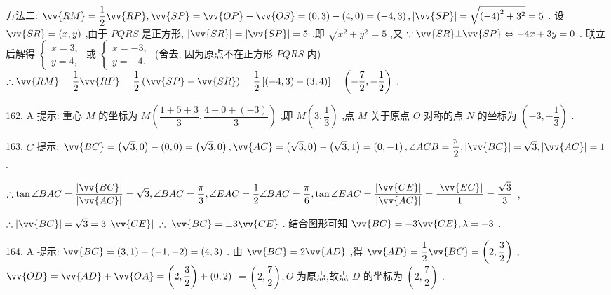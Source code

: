 方法二: $\vv{RM} = \dfrac{1}{2}\vv{RP},\vv{SP} = \vv{OP} - \vv{OS} = \left( {0,3}\right)  - \left( {4,0}\right)  = \left( {-4,3}\right) ,\left| \vv{SP}\right|  = \sqrt{{\left( -4\right) }^{2} + {3}^{2}} = 5$ . 设 $\vv{SR} = \left( {x,y}\right)$ ,由于 ${PQRS}$ 是正方形, $\left| \vv{SR}\right|  = \left| \vv{SP}\right|  = 5$ ,即 $\sqrt{{x}^{2} + {y}^{2}} = 5$ ,又 $\because \vv{SR}\bot \vv{SP} \Leftrightarrow   - {4x} + {3y} = 0$ . 联立后解得 $\left\{  \begin{array}{l} x = 3, \\  y = 4, \end{array}\right.$ 或 $\left\{  \begin{array}{l} x =  - 3, \\  y =  - 4. \end{array}\right.$ (舍去, 因为原点不在正方形 ${PQRS}$ 内) $\therefore \vv{RM} = \dfrac{1}{2}\vv{RP} = \dfrac{1}{2}\left( {\vv{SP} - \vv{SR}}\right)  = \dfrac{1}{2}\left\lbrack  {\left( {-4,3}\right)  - \left( {3,4}\right) }\right\rbrack   = \left( {-\dfrac{7}{2}, - \dfrac{1}{2}}\right)$ .

162. A 提示: 重心 $M$ 的坐标为 $M\left( {\dfrac{1 + 5 + 3}{3},\dfrac{4 + 0 + \left( {-3}\right) }{3}}\right)$ ,即 $M\left( {3,\dfrac{1}{3}}\right)$ ,点 $M$ 关于原点 $O$ 对称的点 $N$ 的坐标为 $\left( {-3, - \dfrac{1}{3}}\right)$ .

163. $C$ 提示: $\vv{BC} = \left( {\sqrt{3},0}\right)  - \left( {0,0}\right)  = \left( {\sqrt{3},0}\right) ,\vv{AC} = \left( {\sqrt{3},0}\right)  - \left( {\sqrt{3},1}\right)  = \left( {0, - 1}\right) ,\angle {ACB} = \dfrac{\pi }{2},\left| \vv{BC}\right|  = \sqrt{3},\left| \vv{AC}\right|  = 1$ .

$\therefore \tan \angle {BAC} = \dfrac{\left| \vv{BC}\right| }{\left| \vv{AC}\right| } = \sqrt{3},\angle {BAC} = \dfrac{\pi }{3},\angle {EAC} = \dfrac{1}{2}\angle {BAC} = \dfrac{\pi }{6},\tan \angle {EAC} = \dfrac{\left| \vv{CE}\right| }{\left| \vv{AC}\right| } = \dfrac{\left| \vv{EC}\right| }{1} = \dfrac{\sqrt{3}}{3}$ ,

$\therefore \left| \vv{BC}\right|  = \sqrt{3} = 3\left| \vv{CE}\right| \;\therefore \;\vv{BC} =  \pm  3\vv{CE}$ . 结合图形可知 $\vv{BC} =  - 3\vv{CE},\lambda  =  - 3$ .

164. A 提示: $\vv{BC} = \left( {3,1}\right)  - \left( {-1, - 2}\right)  = \left( {4,3}\right)$ . 由 $\vv{BC} = 2\vv{AD}$ ,得 $\vv{AD} = \dfrac{1}{2}\vv{BC} = \left( {2,\dfrac{3}{2}}\right)$ , $\vv{OD} = \vv{AD} + \vv{OA} = \left( {2,\dfrac{3}{2}}\right)  + \left( {0,2}\right)$  $= \left( {2,\dfrac{7}{2}}\right) ,O$ 为原点,故点 $D$ 的坐标为 $\left( {2,\dfrac{7}{2}}\right)$ .

